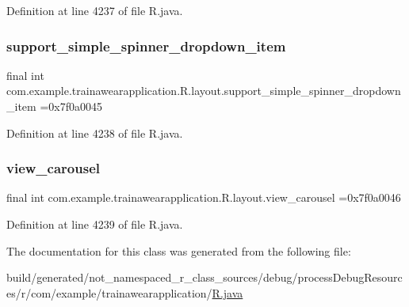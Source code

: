 Definition at line 4237 of file R.\+java.

\mbox{\label{classcom_1_1example_1_1trainawearapplication_1_1_r_1_1layout_a4bfe41483221a76a61ceb29c5b586e74}} 
\subsubsection{\texorpdfstring{support\_simple\_spinner\_dropdown\_item}{support\_simple\_spinner\_dropdown\_item}}
{\footnotesize\ttfamily final int com.\+example.\+trainawearapplication.\+R.\+layout.\+support\+\_\+simple\+\_\+spinner\+\_\+dropdown\+\_\+item =0x7f0a0045\hspace{0.3cm}{\ttfamily [static]}}



Definition at line 4238 of file R.\+java.

\mbox{\label{classcom_1_1example_1_1trainawearapplication_1_1_r_1_1layout_aabf14a74425ec5b01a6a16fb4ed9dcab}} 
\subsubsection{\texorpdfstring{view\_carousel}{view\_carousel}}
{\footnotesize\ttfamily final int com.\+example.\+trainawearapplication.\+R.\+layout.\+view\+\_\+carousel =0x7f0a0046\hspace{0.3cm}{\ttfamily [static]}}



Definition at line 4239 of file R.\+java.



The documentation for this class was generated from the following file\+:\begin{DoxyCompactItemize}
\item 
build/generated/not\+\_\+namespaced\+\_\+r\+\_\+class\+\_\+sources/debug/process\+Debug\+Resources/r/com/example/trainawearapplication/\mbox{\hyperlink{com_2example_2trainawearapplication_2_r_8java}{R.\+java}}\end{DoxyCompactItemize}
